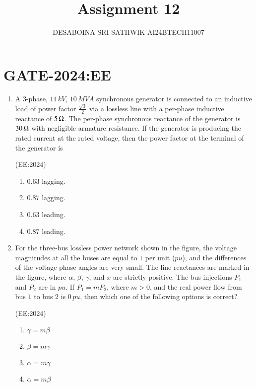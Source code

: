 \documentclass[journal,12pt,onecolumn]{IEEEtran}
\theoremstyle{remark}
\begin{document}

\vspace{3cm}

\title{Assignment 12}
\author{DESABOINA SRI SATHWIK-AI24BTECH11007}
\maketitle
\bigskip

\section*{GATE-2024:EE}
\begin{enumerate}
    \item A 3-phase, $11\, kV$, $10\, MVA$ synchronous generator is connected to an inductive load of power factor $\frac{\sqrt{3}}{2}$ via a lossless line with a per-phase inductive reactance of $5 \,\ohm$. The per-phase synchronous reactance of the generator is $30\, \ohm$ with negligible armature resistance. If the generator is producing the rated current at the rated voltage, then the power factor at the terminal of the generator is
	   
	    \hfill{(EE:2024)}
		\begin{multicols}{4}
    \begin{enumerate}
        \item $0.63$ lagging.
        \item $0.87$ lagging.
        \item $0.63$ leading.
        \item $0.87$ leading.
    \end{enumerate}
\end{multicols}
    \item For the three-bus lossless power network shown in the figure, the voltage magnitudes at all the buses are equal to $1$ per unit ($pu$), and the differences of the voltage phase angles are very small. The line reactances are marked in the figure, where $\alpha$, $\beta$, $\gamma$, and $x$ are strictly positive. The bus injections $P_1$ and $P_2$ are in $pu$. If $P_1 = mP_2$, where $m > 0$, and the real power flow from bus $1$ to bus $2$ is $0\, pu$, then which one of the following options is correct?

	    
	    \hfill{(EE:2024)}
		\begin{multicols}{4}
    \begin{enumerate}
        \item $\gamma = m\beta$
        \item $\beta = m\gamma$
        \item $\alpha = m\gamma$
        \item $\alpha = m\beta$
    \end{enumerate}
			\end{multicols}


\end{enumerate}
\end{document}
